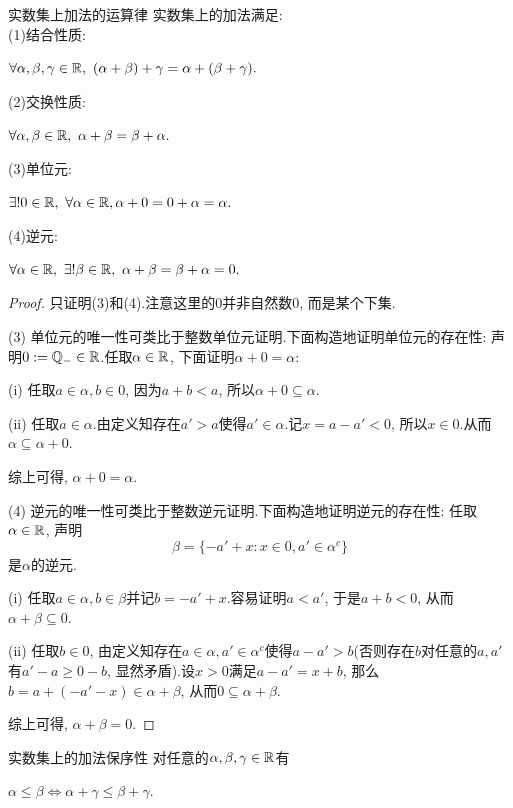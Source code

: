 \begin{proposition}{实数集上加法的运算律}
	实数集上的加法满足:  \\
	(1)结合性质: 
	\begin{center}
		$\forall \alpha , \beta , \gamma \in \mathbb{R} , ~(\alpha + \beta ) + \gamma = \alpha + (\beta + \gamma).$
	\end{center}
	(2)交换性质: 
	\begin{center}
		$\forall \alpha , \beta \in \mathbb{R}, ~\alpha + \beta = \beta + \alpha .$
	\end{center}
	(3)单位元: 
	\begin{center}
		$\exists ! 0 \in \mathbb{R} , ~\forall \alpha \in \mathbb{R} ,  \alpha + 0 = 0 + \alpha = \alpha .$
	\end{center}
	(4)逆元: 
	\begin{center}
		$\forall \alpha \in \mathbb{R} , ~\exists ! \beta \in \mathbb{R} , ~\alpha + \beta = \beta + \alpha = 0.$
	\end{center}
\end{proposition}
\begin{proof}
	只证明(3)和(4).注意这里的$0$并非自然数$0$, 而是某个下集. 
	
	(3) 单位元的唯一性可类比于整数单位元证明.下面构造地证明单位元的存在性: 声明$0 : = \mathbb{Q}_{-} \in \mathbb{R}$.任取$\alpha \in \mathbb{R}$, 下面证明$\alpha + 0 = \alpha$:  
	
	(i) 任取$a \in \alpha , b \in 0$, 因为$a + b < a$, 所以$\alpha + 0 \subseteq \alpha$. 
	
	(ii) 任取$a \in \alpha$.由定义知存在$a'>a$使得$a' \in \alpha$.记$x=a-a'<0$, 所以$x \in 0$.从而$\alpha \subseteq \alpha + 0$. 
	
	综上可得, $\alpha +0 = \alpha$. 
	
	(4) 逆元的唯一性可类比于整数逆元证明.下面构造地证明逆元的存在性: 任取$\alpha \in \mathbb{R}$, 声明$$\beta = \{ -a'+x: x \in 0, a' \in \alpha ^c \}$$是$\alpha$的逆元. 
	
	(i) 任取$a \in \alpha , b \in \beta$并记$b=-a'+x$.容易证明$a<a'$, 于是$a+b <0$, 从而$\alpha + \beta \subseteq 0$. 
	
	(ii) 任取$b \in 0$, 由定义知存在$a \in \alpha , a' \in \alpha ^c$使得$a - a'>b$(否则存在$b$对任意的$a, a'$有$a'-a \geq 0-b$, 显然矛盾).设$x>0$满足$a-a'=x+b$, 那么$b=a+(-a'-x) \in \alpha + \beta$, 从而$0 \subseteq \alpha + \beta$. 
	
	综上可得, $\alpha + \beta = 0$.
\end{proof}

\begin{proposition}{实数集上的加法保序性}
	对任意的$\alpha , \beta , \gamma \in \mathbb{R}$有
	\begin{center}
		$\alpha \leq \beta \Leftrightarrow \alpha + \gamma \leq \beta + \gamma .$
	\end{center}
\end{proposition}


